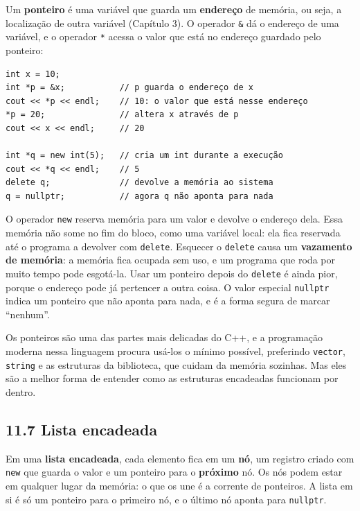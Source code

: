 Um \textbf{ponteiro} é uma variável que guarda um \textbf{endereço} de memória, ou seja, a localização de outra variável (Capítulo 3). O operador \texttt{\&} dá o endereço de uma variável, e o operador \texttt{*} acessa o valor que está no endereço guardado pelo ponteiro:

\begin{codigo}
\begin{Verbatim}[breaklines=true, breaksymbolleft={}, fontsize=\footnotesize]
int x = 10;
int *p = &x;           // p guarda o endereço de x
cout << *p << endl;    // 10: o valor que está nesse endereço
*p = 20;               // altera x através de p
cout << x << endl;     // 20

int *q = new int(5);   // cria um int durante a execução
cout << *q << endl;    // 5
delete q;              // devolve a memória ao sistema
q = nullptr;           // agora q não aponta para nada
\end{Verbatim}
\end{codigo}

O operador \texttt{new} reserva memória para um valor e devolve o endereço dela. Essa memória não some no fim do bloco, como uma variável local: ela fica reservada até o programa a devolver com \texttt{delete}. Esquecer o \texttt{delete} causa um \textbf{vazamento de memória}: a memória fica ocupada sem uso, e um programa que roda por muito tempo pode esgotá-la. Usar um ponteiro depois do \texttt{delete} é ainda pior, porque o endereço pode já pertencer a outra coisa. O valor especial \texttt{nullptr} indica um ponteiro que não aponta para nada, e é a forma segura de marcar ``nenhum''.

Os ponteiros são uma das partes mais delicadas do C++, e a programação moderna nessa linguagem procura usá-los o mínimo possível, preferindo \texttt{vector}, \texttt{string} e as estruturas da biblioteca, que cuidam da memória sozinhas. Mas eles são a melhor forma de entender como as estruturas encadeadas funcionam por dentro.

\subsection{11.7 Lista encadeada}

Em uma \textbf{lista encadeada}, cada elemento fica em um \textbf{nó}, um registro criado com \texttt{new} que guarda o valor e um ponteiro para o \textbf{próximo} nó. Os nós podem estar em qualquer lugar da memória: o que os une é a corrente de ponteiros. A lista em si é só um ponteiro para o primeiro nó, e o último nó aponta para \texttt{nullptr}.

